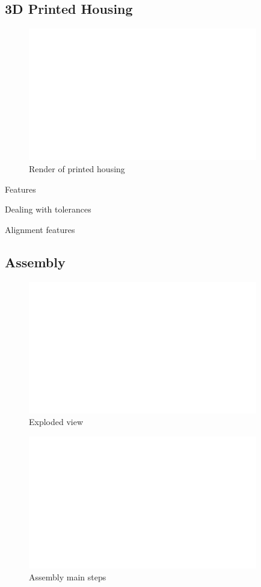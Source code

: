 \clearpage
\subsection{3D Printed Housing}

\begin{figure}[h!]\centering \includegraphics[width=10cm,draft]{figures/foo.png}
      \caption{Render of printed housing}
\end{figure}

Features

Dealing with tolerances

Alignment features


\clearpage
\subsection{Assembly}
\begin{figure}[h!]\centering \includegraphics[width=10cm,draft]{figures/foo.png}
      \caption{Exploded view}
\end{figure}

\begin{figure}[h!]\centering \includegraphics[width=10cm,draft]{figures/foo.png}
      \caption{Assembly main steps}
\end{figure}




